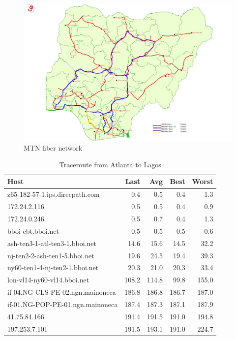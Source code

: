 \documentclass[]{sigplanconf}
\begin{document}
\begin{itemize}
\begin{figure}[t]
\centering
\includegraphics[width=\linewidth]{mtn.jpg}
\caption{MTN fiber network}
\end{figure}

	\begin{table}[h]
\begin{tabular}{ l | r | r | r | r }
	\textbf{Host} &
	\textbf{Last} &
	\textbf{Avg} &
	\textbf{Best} &
	\textbf{Worst} \\
\hline
z65-182-57-1.ips.direcpath.com & 0.4 & 0.5 & 0.4 & 1.3 \\
172.24.2.116 & 0.5 & 0.5 & 0.4 & 0.9 \\
172.24.0.246 & 0.5 & 0.7 & 0.4 & 1.3 \\
bboi-cbt.bboi.net & 0.5 & 0.5 & 0.5 & 0.6 \\
ash-ten3-1-atl-ten3-1.bboi.net & 14.6 & 15.6 & 14.5 & 32.2 \\
nj-ten2-2-ash-ten1-5.bboi.net & 19.6 & 24.5 & 19.4 & 39.3 \\
ny60-ten1-4-nj-ten2-1.bboi.net & 20.3 & 21.0 & 20.3 & 33.4 \\
lon-vl14-ny60-vl14.bboi.net & 108.2 & 114.8 & 99.8 & 155.0 \\
if-04.NG-CLS-PE-02.ngn.mainoneca & 186.8 & 186.8 & 186.7 & 187.0 \\
if-01.NG-POP-PE-01.ngn.mainoneca & 187.4 & 187.3 & 187.1 & 187.9 \\
41.75.84.166 & 191.4 & 191.5 & 191.0 & 194.8 \\
197.253.7.101 & 191.5 & 193.1 & 191.0 & 224.7 \\
\hline
\end{tabular}
\caption{Traceroute from Atlanta to Lagos}
\end{table}


\end{itemize}
\end{document}
